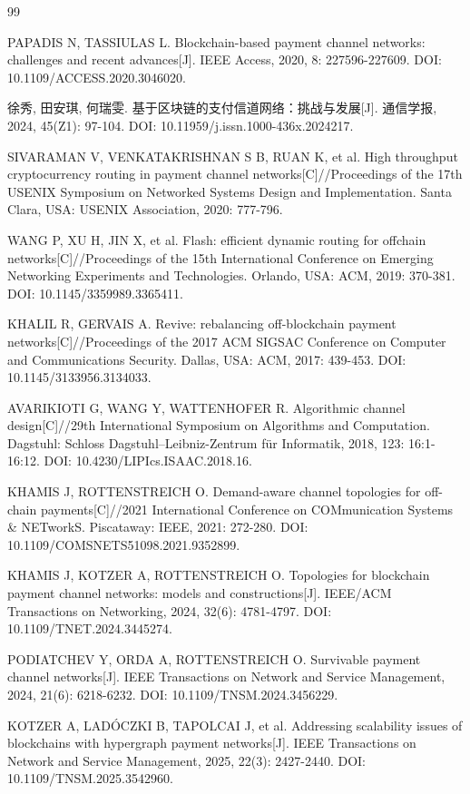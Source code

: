 \documentclass[UTF8,a4paper,twocolumn,fontset=none,zihao=5]{ctexart}
\begin{document}
\begin{thebibliography}{99}\small\linespread{0.96}\selectfont\raggedright\setlength{\itemsep}{0pt}

 PAPADIS N, TASSIULAS L. Blockchain-based payment channel networks: challenges and recent advances[J]. IEEE Access, 2020, 8: 227596-227609. DOI: 10.1109/ACCESS.2020.3046020.

 徐秀, 田安琪, 何瑞雯. 基于区块链的支付信道网络：挑战与发展[J]. 通信学报, 2024, 45(Z1): 97-104. DOI: 10.11959/j.issn.1000-436x.2024217.

 SIVARAMAN V, VENKATAKRISHNAN S B, RUAN K, et al. High throughput cryptocurrency routing in payment channel networks[C]//Proceedings of the 17th USENIX Symposium on Networked Systems Design and Implementation. Santa Clara, USA: USENIX Association, 2020: 777-796.

 WANG P, XU H, JIN X, et al. Flash: efficient dynamic routing for offchain networks[C]//Proceedings of the 15th International Conference on Emerging Networking Experiments and Technologies. Orlando, USA: ACM, 2019: 370-381. DOI: 10.1145/3359989.3365411.

 KHALIL R, GERVAIS A. Revive: rebalancing off-blockchain payment networks[C]//Proceedings of the 2017 ACM SIGSAC Conference on Computer and Communications Security. Dallas, USA: ACM, 2017: 439-453. DOI: 10.1145/3133956.3134033.

 AVARIKIOTI G, WANG Y, WATTENHOFER R. Algorithmic channel design[C]//29th International Symposium on Algorithms and Computation. Dagstuhl: Schloss Dagstuhl–Leibniz-Zentrum für Informatik, 2018, 123: 16:1-16:12. DOI: 10.4230/LIPIcs.ISAAC.2018.16.

 KHAMIS J, ROTTENSTREICH O. Demand-aware channel topologies for off-chain payments[C]//2021 International Conference on COMmunication Systems \& NETworkS. Piscataway: IEEE, 2021: 272-280. DOI: 10.1109/COMSNETS51098.2021.9352899.

 KHAMIS J, KOTZER A, ROTTENSTREICH O. Topologies for blockchain payment channel networks: models and constructions[J]. IEEE/ACM Transactions on Networking, 2024, 32(6): 4781-4797. DOI: 10.1109/TNET.2024.3445274.

 PODIATCHEV Y, ORDA A, ROTTENSTREICH O. Survivable payment channel networks[J]. IEEE Transactions on Network and Service Management, 2024, 21(6): 6218-6232. DOI: 10.1109/TNSM.2024.3456229.

 KOTZER A, LADÓCZKI B, TAPOLCAI J, et al. Addressing scalability issues of blockchains with hypergraph payment networks[J]. IEEE Transactions on Network and Service Management, 2025, 22(3): 2427-2440. DOI: 10.1109/TNSM.2025.3542960.


\end{thebibliography}
\end{document}
